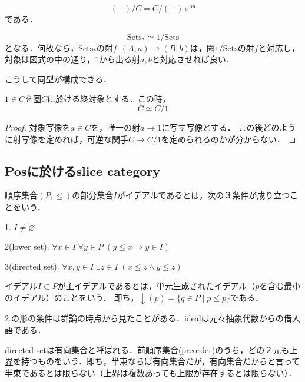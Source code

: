 \documentclass[uplatex, 12pt, dvipdfmx]{jsarticle}
\begin{document}
\begin{proposition*}
    \[ (-)/C = C/(-)\circ {}^{op} \]
    である．
\end{proposition*}

\begin{example}
    \[\mathrm{Sets}_*\simeq 1/\mathrm{Sets}\]
    となる．何故なら，$\mathrm{Sets}_*$の射$f:(A,a)\to (B,b)$は，圏$1/\mathrm{Sets}$の射$f$と対応し，対象は図式の中の通り，$1$から出る射$a,b$と対応させれば良い．
    \begin{center}
    \end{center}
    こうして同型が構成できる．
\end{example}

\begin{proposition*}
    $1\in C$を圏$C$に於ける終対象とする．この時，
    \[ C\simeq C/1 \]
\end{proposition*}
\begin{proof}
    対象写像を$a\in C$を，唯一の射$a\to 1$に写す写像とする．
    この後どのように射写像を定めれば，可逆な関手$C\to C/1$を定められるのかが分からない．
\end{proof}

\subsection*{Posに於けるslice category}

\begin{definition*}
    順序集合$(P,\le)$の部分集合$I$がイデアルであるとは，次の３条件が成り立つことをいう．

    1. $I\ne\varnothing$

    2(lower set). $\forall x\in I\; \forall y\in P\; (y\le x\Rightarrow y\in I)$

    3(directed set). $\forall x,y\in I\; \exists z\in I\; (x\le z\land y\le z)$

    イデアル$I\subset P$が主イデアルであるとは，単元生成されたイデアル（$p$を含む最小のイデアル）のことをいう．
    即ち，$\downarrow(p)=\{q\in P\mid p\le p\}$である．
\end{definition*}
\begin{remark*}
    2.の形の条件は群論の時点から見たことがある．idealは元々抽象代数からの借入語である．

    directed setは有向集合と呼ばれる．前順序集合(preorder)のうち，どの２元も\underline{上界}を持つものをいう．即ち，半束ならば有向集合だが，有向集合だからと言って半束であるとは限らない（上界は複数あっても上限が存在するとは限らない）．
\end{remark*}
\end{document}
